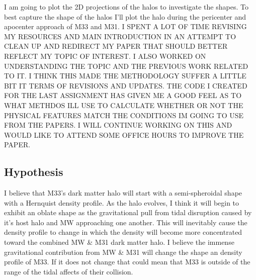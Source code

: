 \documentclass[fleqn,usenatbib]{mnras}
\begin{document}
I am going to plot the 2D projections of the halos to investigate the shapes. To best capture the shape of the halos I'll plot the halo during the pericenter and apocenter approach of M33 and M31. 
I SPENT A LOT OF TIME REVISING MY RESOURCES AND MAIN INTRODUCTION IN AN ATTEMPT TO CLEAN UP AND REDIRECT MY PAPER THAT SHOULD BETTER REFLECT MY TOPIC OF INTEREST. I ALSO WORKED ON UNDERSTANDING THE TOPIC AND THE PREVIOUS WORK RELATED TO IT. I THINK THIS MADE THE METHODOLOGY SUFFER A LITTLE BIT IT TERMS OF REVISIONS AND UPDATES. THE CODE I CREATED FOR THE LAST ASSIGNMENT HAS GIVEN ME A GOOD FEEL AS TO WHAT METHDOS ILL USE TO CALCULATE WHETHER OR NOT THE PHYSICAL FEATURES MATCH THE CONDITIONS IM GOING TO USE FROM THE PAPERS. I WILL CONTINUE WORKING ON THIS AND WOULD LIKE TO ATTEND SOME OFFICE HOURS TO IMPROVE THE PAPER. 

\subsection{Hypothesis}
I believe that M33's dark matter halo will start with a semi-spheroidal shape with a Hernquist density profile. As the halo evolves, I think it will begin to exhibit an oblate shape as the gravitational pull from tidal disruption caused by it's host halo and MW approaching one another. This will inevitably cause the density profile to change in which the density will become more concentrated toward the combined MW \& M31 dark matter halo. I believe the immense gravitational contribution from MW \& M31 will change the shape an density profile of M33. If it does not change that could mean that M33 is outside of the range of the tidal affects of their collision.   


 



\bsp	%
\label{lastpage}
\end{document}
